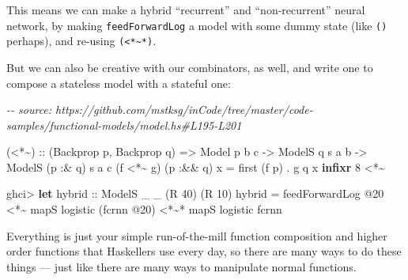 \documentclass[]{article}
\newenvironment{Shaded}{}{}
\newcommand{\CommentTok}[1]{\textcolor[rgb]{0.38,0.63,0.69}{\textit{#1}}}
\newcommand{\DataTypeTok}[1]{\textcolor[rgb]{0.56,0.13,0.00}{#1}}
\newcommand{\DecValTok}[1]{\textcolor[rgb]{0.25,0.63,0.44}{#1}}
\newcommand{\KeywordTok}[1]{\textcolor[rgb]{0.00,0.44,0.13}{\textbf{#1}}}
\newcommand{\NormalTok}[1]{#1}
\newcommand{\OperatorTok}[1]{\textcolor[rgb]{0.40,0.40,0.40}{#1}}
\newcommand{\OtherTok}[1]{\textcolor[rgb]{0.00,0.44,0.13}{#1}}
\begin{document}
This means we can make a hybrid ``recurrent'' and ``non-recurrent'' neural
network, by making \texttt{feedForwardLog\textquotesingle{}} a model with some
dummy state (like \texttt{()} perhaps), and re-using
\texttt{(\textless{}*\textasciitilde{}*)}.

But we can also be creative with our combinators, as well, and write one to
compose a stateless model with a stateful one:

\begin{Shaded}
\begin{Highlighting}[]
\CommentTok{{-}{-} source: https://github.com/mstksg/inCode/tree/master/code{-}samples/functional{-}models/model.hs\#L195{-}L201}

\NormalTok{(}\OperatorTok{\textless{}*\textasciitilde{}}\NormalTok{)}
\OtherTok{  ::}\NormalTok{ (}\DataTypeTok{Backprop}\NormalTok{ p, }\DataTypeTok{Backprop}\NormalTok{ q)}
    \OtherTok{=\textgreater{}} \DataTypeTok{Model}\NormalTok{   p         b c}
    \OtherTok{{-}\textgreater{}} \DataTypeTok{ModelS}\NormalTok{       q  s a b}
    \OtherTok{{-}\textgreater{}} \DataTypeTok{ModelS}\NormalTok{ (p }\OperatorTok{:\&}\NormalTok{ q) s a c}
\NormalTok{(f }\OperatorTok{\textless{}*\textasciitilde{}}\NormalTok{ g) (p }\OperatorTok{:\&\&}\NormalTok{ q) x }\OtherTok{=}\NormalTok{ first (f p) }\OperatorTok{.}\NormalTok{ g q x}
\KeywordTok{infixr} \DecValTok{8} \OperatorTok{\textless{}*\textasciitilde{}}
\end{Highlighting}
\end{Shaded}

\begin{Shaded}
\begin{Highlighting}[]
\NormalTok{ghci}\OperatorTok{\textgreater{}} \KeywordTok{let}\OtherTok{ hybrid ::} \DataTypeTok{ModelS}\NormalTok{ \_ \_ (}\DataTypeTok{R} \DecValTok{40}\NormalTok{) (}\DataTypeTok{R} \DecValTok{10}\NormalTok{)}
\NormalTok{          hybrid }\OtherTok{=}\NormalTok{ feedForwardLog\textquotesingle{} }\OperatorTok{@}\DecValTok{20}
              \OperatorTok{\textless{}*\textasciitilde{}}\NormalTok{  mapS logistic (fcrnn }\OperatorTok{@}\DecValTok{20}\NormalTok{)}
              \OperatorTok{\textless{}*\textasciitilde{}*}\NormalTok{ mapS logistic fcrnn}
\end{Highlighting}
\end{Shaded}

Everything is just your simple run-of-the-mill function composition and higher
order functions that Haskellers use every day, so there are many ways to do
these things --- just like there are many ways to manipulate normal functions.
\end{document}
